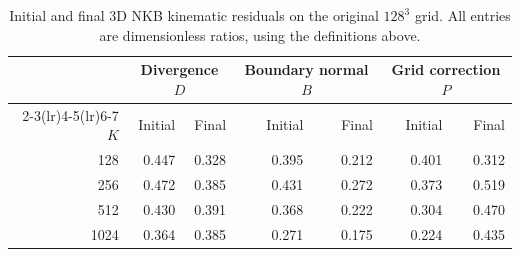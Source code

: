 \begin{table}[!htb]
\centering\small
\caption{Initial and final 3D NKB kinematic residuals on the original $128^3$ grid. All entries are dimensionless ratios, using the definitions above.}
\label{tab:nkb-3d-kinematics}
\begin{tabular}{rrrrrrr}\toprule
&\multicolumn{2}{c}{Divergence $D$}&\multicolumn{2}{c}{Boundary normal $B$}&\multicolumn{2}{c}{Grid correction $P$}\\
\cmidrule(lr){2-3}\cmidrule(lr){4-5}\cmidrule(lr){6-7}
$K$&Initial&Final&Initial&Final&Initial&Final\\\midrule
128&0.447&0.328&0.395&0.212&0.401&0.312\\
256&0.472&0.385&0.431&0.272&0.373&0.519\\
512&0.430&0.391&0.368&0.222&0.304&0.470\\
1024&0.364&0.385&0.271&0.175&0.224&0.435\\
\bottomrule\end{tabular}
\end{table}
